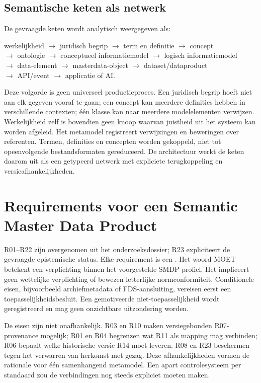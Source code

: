 \subsection{Semantische keten als netwerk}
De gevraagde keten wordt analytisch weergegeven als:
\begin{center}\small
werkelijkheid $\rightarrow$ juridisch begrip $\rightarrow$ term en definitie $\rightarrow$ concept\\
$\rightarrow$ ontologie $\rightarrow$ conceptueel informatiemodel $\rightarrow$ logisch informatiemodel\\
$\rightarrow$ data-element $\rightarrow$ masterdata-object $\rightarrow$ dataset/dataproduct\\
$\rightarrow$ API/event $\rightarrow$ applicatie of AI.
\end{center}
Deze volgorde is geen universeel productieproces. Een juridisch begrip hoeft niet aan elk gegeven vooraf te gaan; een concept kan meerdere definities hebben in verschillende contexten; één klasse kan naar meerdere modelelementen verwijzen. Werkelijkheid zelf is bovendien geen knoop waarvan juistheid uit het systeem kan worden afgeleid. Het metamodel registreert verwijzingen en beweringen over referenten. Termen, definities en concepten worden gekoppeld, niet tot opeenvolgende bestandsformaten gereduceerd. De architectuur werkt de keten daarom uit als een getypeerd netwerk met expliciete terugkoppeling en versieafhankelijkheden.



\section{Requirements voor een Semantic Master Data Product}
\label{sec:requirements}
R01--R22 zijn overgenomen uit het onderzoeksdossier; R23 expliciteert de gevraagde epistemische status. Elke requirement is een . Het woord MOET betekent een verplichting binnen het voorgestelde SMDP-profiel. Het impliceert geen wettelijke verplichting of bewezen letterlijke normconformiteit. Conditionele eisen, bijvoorbeeld archiefmetadata of FDS-aansluiting, vereisen eerst een toepasselijkheidsbesluit. Een gemotiveerde niet-toepasselijkheid wordt geregistreerd en mag geen onzichtbare uitzondering worden.



De eisen zijn niet onafhankelijk. R03 en R10 maken versiegebonden R07-provenance mogelijk; R01 en R04 begrenzen wat R11 als mapping mag verbinden; R06 bepaalt welke historische versie R14 moet leveren. R08 en R23 beschermen tegen het verwarren van herkomst met gezag. Deze afhankelijkheden vormen de rationale voor één samenhangend metamodel. Een apart controlesysteem per standaard zou de verbindingen nog steeds expliciet moeten maken.

